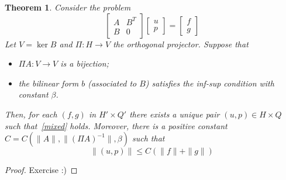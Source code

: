 \documentclass{article}
\newtheorem{theorem}{Theorem}
\begin{document}
\begin{theorem}
    Consider the problem
    \begin{equation*}\label{mixed}
        \begin{bmatrix}
            A & B^{T}\\ 
            B & 0
        \end{bmatrix}
        \begin{bmatrix}
            u \\ p
        \end{bmatrix}
        =
        \begin{bmatrix}
            f \\ g
        \end{bmatrix}
    \end{equation*}
    Let \(V = \ker B\) and \(\Pi\colon H\to V\) the orthogonal
    projector. Suppose that
    \begin{itemize}
        \item \(\Pi A\colon V\to V\) is a bijection;
        \item the bilinear form \(b\) (associated to \(B\))
        satisfies the inf-sup condition with constant \(\beta\).
    \end{itemize}
    Then, for each \((f,g)\) in \(H'\times Q'\) there exists
    a unique pair \((u,p)\in H\times Q\) such that~\eqref{mixed}
    holds. Moreover, there is a positive constant
    \(C=C(\|A\|, \| (\Pi A)^{-1}\|, \beta)\) such that
    \begin{equation*}
        \| (u,p) \|
        \le
        C \left( \|f\| + \|g\| \right) 
    \end{equation*}
\end{theorem}
\begin{proof}
    Exercise :)
\end{proof}

\end{document}
